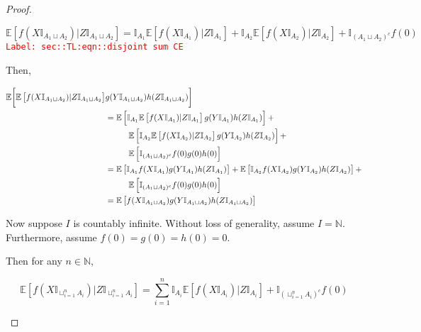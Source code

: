 \documentclass[12pt]{article}
\newcommand{\mb}{\mathbb}
\newcommand{\tr}{\textcolor{red}}
\newcommand{\labe}[1]{\tr{\texttt{Label: #1}}}
\newcommand{\ex}[1]{\mb{E}\left[#1\right]}			%
\newcommand{\X}{X}								%
\newcommand{\indx}[1]{_{#1}}					%
\newcommand{\XX}{Y}								%
\newcommand{\XXX}{Z}							%
\newcommand{\typset}{A}							%
\begin{document}
\begin{proof}
\begin{enumerate}[(a)]
\begin{equation}
\ex{f(\X\mb{I}_{\typset\indx{1}\sqcup \typset\indx{2}})|\XXX\mb{I}_{\typset\indx{1}\sqcup \typset\indx{2}}} = \mb{I}_{\typset\indx{1}}\ex{f(\X\mb{I}_{\typset\indx{1}})|\XXX\mb{I}_{\typset\indx{1}}} + \mb{I}_{\typset\indx{2}}\ex{f(\X\mb{I}_{\typset\indx{2}})|\XXX\mb{I}_{\typset\indx{2}}} + \mb{I}_{(\typset\indx{1}\sqcup \typset\indx{2})^c}f(0)
\label{sec::TL:eqn::disjoint sum CE}
\end{equation}
\labe{sec::TL:eqn::disjoint sum CE}

Then,

\begin{align*}
\mb{E}\bigg[\ex{f(\X\mb{I}_{\typset\indx{1}\sqcup \typset\indx{2}})|\XXX\mb{I}_{\typset\indx{1}\sqcup \typset\indx{2}}}&g(\XX\mb{I}_{\typset\indx{1}\sqcup \typset\indx{2}})h(\XXX\mb{I}_{\typset\indx{1}\sqcup \typset\indx{2}})\bigg]\\
&= \ex{\mb{I}_{\typset\indx{1}}\ex{f(\X\mb{I}_{\typset\indx{1}})|\XXX\mb{I}_{\typset\indx{1}}}g(\XX\mb{I}_{\typset\indx{1}})h(\XXX\mb{I}_{\typset\indx{1}})} +\\
&\hspace{1 cm} \ex{\mb{I}_{\typset\indx{2}}\ex{f(\X\mb{I}_{\typset\indx{2}})|\XXX\mb{I}_{\typset\indx{2}}}g(\XX\mb{I}_{\typset\indx{2}})h(\XXX\mb{I}_{\typset\indx{2}})} + \\
&\hspace{1 cm} \ex{\mb{I}_{(\typset\indx{1}\sqcup \typset\indx{2})^c}f(0)g(0)h(0)}\\
&= \ex{\mb{I}_{\typset\indx{1}}f(\X\mb{I}_{\typset\indx{1}})g(\XX\mb{I}_{\typset\indx{1}})h(\XXX\mb{I}_{\typset\indx{1}})} + \ex{\mb{I}_{\typset\indx{2}}f(\X\mb{I}_{\typset\indx{2}})g(\XX\mb{I}_{\typset\indx{2}})h(\XXX\mb{I}_{\typset\indx{2}})} +\\
&\hspace{1 cm} \ex{\mb{I}_{(\typset\indx{1}\sqcup \typset\indx{2})^c}f(0)g(0)h(0)}\\
&= \ex{f(\X\mb{I}_{\typset\indx{1}\sqcup \typset\indx{2}})g(\XX\mb{I}_{\typset\indx{1}\sqcup \typset\indx{2}})h(\XXX\mb{I}_{\typset\indx{1}\sqcup \typset\indx{2}})}
\end{align*}

Now suppose \(I\) is countably infinite. Without loss of generality, assume \(I = \mb{N}\). Furthermore, assume \(f(0) = g(0) = h(0) = 0\).

Then for any \(n \in \mb{N}\),

\[\ex{f(\X\mb{I}_{\sqcup_{i=1}^n \typset\indx{i}})|\XXX\mb{I}_{\sqcup_{i=1}^n \typset\indx{i}}} = \sum_{i=1}^n \mb{I}_{\typset\indx{i}}\ex{f(\X\mb{I}_{\typset\indx{i}})|\XXX\mb{I}_{\typset\indx{i}}} + \mb{I}_{\left(\sqcup_{i=1}^n \typset\indx{i}\right)^c} f(0)\]


\end{enumerate}
\end{proof}
\end{document}
